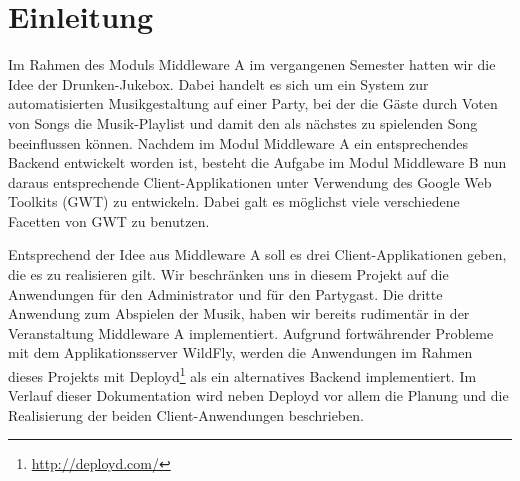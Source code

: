 \section{Einleitung}
Im Rahmen des Moduls Middleware A im vergangenen Semester hatten wir die Idee der Drunken-Jukebox. Dabei handelt es sich um ein System zur automatisierten Musikgestaltung auf einer Party, bei der die Gäste durch Voten von Songs die Musik-Playlist und damit den als nächstes zu spielenden Song beeinflussen können. Nachdem im Modul Middleware A ein entsprechendes Backend entwickelt worden ist, besteht die Aufgabe im Modul Middleware B nun daraus entsprechende Client-Applikationen unter Verwendung des Google Web Toolkits (GWT) zu entwickeln. Dabei galt es möglichst viele verschiedene Facetten von GWT zu benutzen.

Entsprechend der Idee aus Middleware A soll es drei Client-Applikationen geben, die es zu realisieren gilt. Wir beschränken uns in diesem Projekt auf die Anwendungen für den Administrator und für den Partygast. Die dritte Anwendung zum Abspielen der Musik, haben wir bereits rudimentär in der Veranstaltung Middleware A implementiert. Aufgrund fortwährender Probleme mit dem Applikationsserver WildFly, werden die Anwendungen im Rahmen dieses Projekts mit Deployd\footnote{\url{http://deployd.com/}} als ein alternatives Backend implementiert. Im Verlauf dieser Dokumentation wird neben Deployd vor allem die Planung und die Realisierung der beiden Client-Anwendungen beschrieben.